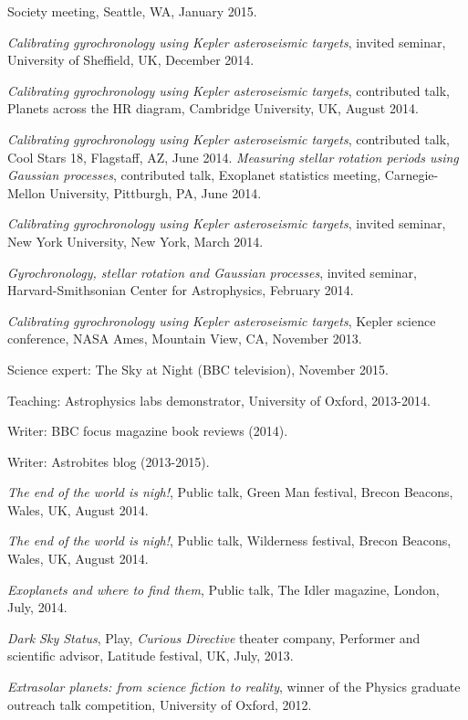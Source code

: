 \documentclass[12pt,letterpaper]{article}
\begin{document}
\begin{list}{}{\cvlist}
Society meeting, Seattle, WA, January 2015.
\item
{\it Calibrating gyrochronology using Kepler asteroseismic targets}, invited
seminar, University of Sheffield, UK, December 2014.
\item
{\it Calibrating gyrochronology using Kepler asteroseismic targets},
contributed talk, Planets across the HR diagram, Cambridge University, UK,
August 2014.
\item
{\it Calibrating gyrochronology using Kepler asteroseismic targets},
contributed talk, Cool Stars 18, Flagstaff, AZ, June 2014.
{\it Measuring stellar rotation periods using Gaussian processes},
contributed talk, Exoplanet statistics meeting, Carnegie-Mellon University,
Pittburgh, PA, June 2014.
\item
{\it Calibrating gyrochronology using Kepler asteroseismic targets}, invited
seminar, New York University, New York, March 2014.
\item
{\it Gyrochronology, stellar rotation and Gaussian processes}, invited
seminar, Harvard-Smithsonian Center for Astrophysics, February 2014.
\item
{\it Calibrating gyrochronology using Kepler asteroseismic targets}, Kepler
science conference, NASA Ames, Mountain View, CA, November 2013.
\end{list}

\begin{list}{}{\cvlist}
\item
Science expert: The Sky at Night (BBC television), November 2015.
\item
Teaching: Astrophysics labs demonstrator, University of Oxford, 2013-2014.
\item
Writer: BBC focus magazine book reviews (2014).
\item
Writer: Astrobites blog (2013-2015).
\item
{\it The end of the world is nigh!}, Public talk, Green Man festival, Brecon
Beacons, Wales, UK, August 2014.
\item
{\it The end of the world is nigh!}, Public talk, Wilderness festival, Brecon
Beacons, Wales, UK, August 2014.
\item
{\it Exoplanets and where to find them}, Public talk, The Idler magazine,
London, July, 2014.
\item
{\it Dark Sky Status}, Play, {\it Curious Directive} theater company,
Performer and scientific advisor, Latitude festival, UK, July, 2013.
\item
{\it Extrasolar planets: from science fiction to reality}, winner of the
Physics graduate outreach talk competition, University of Oxford, 2012.
\end{list}

\ifdefined\withpubs
    \begin{list}{}{\cvlist}
    
    \end{list}
\fi
\end{document}
